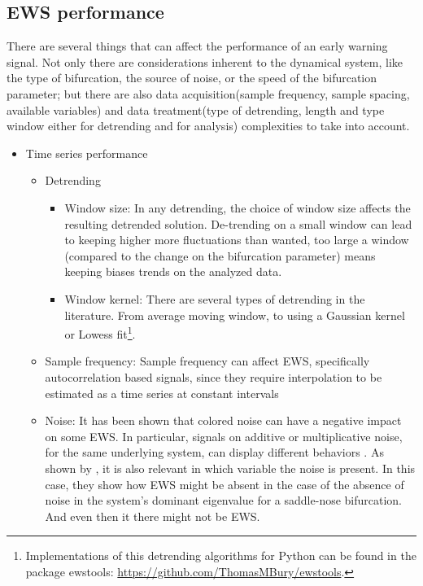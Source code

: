 \subsection{EWS performance}

There are several things that can affect the performance of an early warning signal. Not only there are considerations inherent to the dynamical system, like the type of bifurcation, the source of noise, or the speed of the bifurcation parameter; but there are also data acquisition(sample frequency, sample spacing, available variables) and data treatment(type of detrending, length and type window either for detrending and for analysis) complexities to take into account. 

\begin{itemize}
	\item Time series performance
	\begin{itemize}
		\item Detrending 
		\begin{itemize} 
			\item Window size: In any detrending, the choice of window size affects the resulting detrended solution. De-trending on a small window can lead to keeping higher more fluctuations than wanted, too large a window (compared to the change on the bifurcation parameter) means keeping biases trends on the analyzed data. \citep{Jager2019}
			\item Window kernel: There are several types of detrending in the literature. From average moving window, to using a Gaussian kernel or  Lowess \citep{Dakos2008, Bury2020,Lenton2012} fit\footnote{Implementations of this detrending algorithms for Python can be found in the package ewstools: \url{https://github.com/ThomasMBury/ewstools}.}.  
		\end{itemize}
		\item Sample frequency: Sample frequency can affect EWS, specifically autocorrelation based signals, since they require interpolation to be estimated as a time series at constant intervals \citep{10.1086/681573}
		\item Noise: It has been shown that colored noise can have a negative impact on some EWS. In particular, signals  on additive or multiplicative noise, for the same underlying system, can display different behaviors  \citep{Kaur2022,Dutta2018,10.1086/681573}. 
		As shown by \cite{Boerlijst2013}, it is also relevant in which variable the noise is present. In this case, they show how EWS might be absent in the case of the absence of noise in the system's dominant eigenvalue for a saddle-nose bifurcation. And even then it there might not be EWS.

\end{itemize}
\end{itemize}
